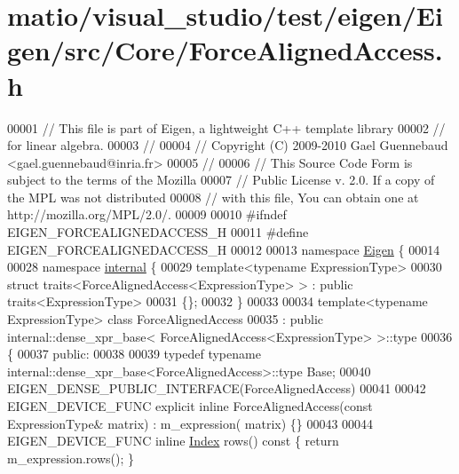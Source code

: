 \hypertarget{matio_2visual__studio_2test_2eigen_2_eigen_2src_2_core_2_force_aligned_access_8h_source}{}\section{matio/visual\+\_\+studio/test/eigen/\+Eigen/src/\+Core/\+Force\+Aligned\+Access.h}
\label{matio_2visual__studio_2test_2eigen_2_eigen_2src_2_core_2_force_aligned_access_8h_source}

\begin{DoxyCode}
00001 \textcolor{comment}{// This file is part of Eigen, a lightweight C++ template library}
00002 \textcolor{comment}{// for linear algebra.}
00003 \textcolor{comment}{//}
00004 \textcolor{comment}{// Copyright (C) 2009-2010 Gael Guennebaud <gael.guennebaud@inria.fr>}
00005 \textcolor{comment}{//}
00006 \textcolor{comment}{// This Source Code Form is subject to the terms of the Mozilla}
00007 \textcolor{comment}{// Public License v. 2.0. If a copy of the MPL was not distributed}
00008 \textcolor{comment}{// with this file, You can obtain one at http://mozilla.org/MPL/2.0/.}
00009 
00010 \textcolor{preprocessor}{#ifndef EIGEN\_FORCEALIGNEDACCESS\_H}
00011 \textcolor{preprocessor}{#define EIGEN\_FORCEALIGNEDACCESS\_H}
00012 
00013 \textcolor{keyword}{namespace }\hyperlink{namespace_eigen}{Eigen} \{
00014 
00028 \textcolor{keyword}{namespace }\hyperlink{namespaceinternal}{internal} \{
00029 \textcolor{keyword}{template}<\textcolor{keyword}{typename} ExpressionType>
00030 \textcolor{keyword}{struct }traits<ForceAlignedAccess<ExpressionType> > : \textcolor{keyword}{public} traits<ExpressionType>
00031 \{\};
00032 \}
00033 
00034 \textcolor{keyword}{template}<\textcolor{keyword}{typename} ExpressionType> \textcolor{keyword}{class }ForceAlignedAccess
00035   : \textcolor{keyword}{public} internal::dense\_xpr\_base< ForceAlignedAccess<ExpressionType> >::type
00036 \{
00037   \textcolor{keyword}{public}:
00038 
00039     \textcolor{keyword}{typedef} \textcolor{keyword}{typename} internal::dense\_xpr\_base<ForceAlignedAccess>::type Base;
00040     EIGEN\_DENSE\_PUBLIC\_INTERFACE(ForceAlignedAccess)
00041 
00042     EIGEN\_DEVICE\_FUNC \textcolor{keyword}{explicit} \textcolor{keyword}{inline} ForceAlignedAccess(\textcolor{keyword}{const} ExpressionType& matrix) : m\_expression(
      matrix) \{\}
00043 
00044     EIGEN\_DEVICE\_FUNC \textcolor{keyword}{inline} \hyperlink{namespace_eigen_a62e77e0933482dafde8fe197d9a2cfde}{Index} rows()\textcolor{keyword}{ const }\{ \textcolor{keywordflow}{return} m\_expression.rows(); \}

\end{DoxyCode}
